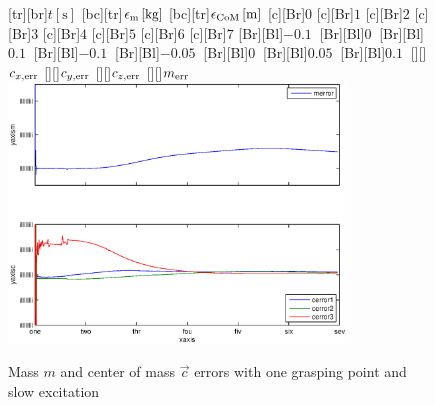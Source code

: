 \begin{figure}
	\centering	
	[tr][br]{$t\left[\mathrm{s}\right]$}
	[bc][tr]{$\epsilon_{\mathrm{m}}\left[\mathrm{kg}\right]$}
	[bc][tr]{$\epsilon_{\mathrm{CoM}}\left[\mathrm{m}\right]$}
	[Br]{$0$}
	[Br]{$1$}
	[Br]{$2$}
	[Br]{$3$}
	[Br]{$4$}
	[Br]{$5$}
	[Br]{$6$}
	[Br]{$7$}
	[Br][Bl]{$-0.1\  $}
	[Br][Bl]{$0\ $}
	[Br][Bl]{$0.1\  $}
	[Br][Bl]{$-0.1\  $}
	[Br][Bl]{$-0.05\ $}
	[Br][Bl]{$0\  $}
	[Br][Bl]{$0.05\  $}
	[Br][Bl]{$0.1\  $}
	[][]{\tiny $c_{x,\mathrm{err}}$}
	[][]{\tiny $c_{y,\mathrm{err}}$}
	[][]{\tiny $c_{z,\mathrm{err}}$}
	[][]{\tiny $m_{\mathrm{err}}$}
	\includegraphics[width=0.8\textwidth]{figures/one_grasping_point_slow_mass_and_cog.eps}
	\vspace{0.2cm}
	\caption[Mass error, one grasping point, slow excitation]{Mass $m$ and center of mass $\vec{c}$ errors with one grasping point and slow excitation}
	\label{fig:estim_mass_one_slow}
\end{figure}

